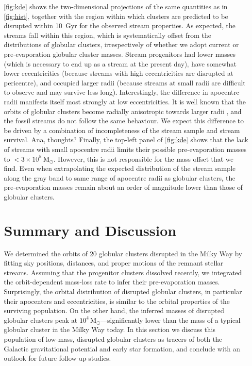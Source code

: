 \documentclass[twocolumn]{aastex63}
\newcommand{\msun}{\ensuremath{\textrm{M}_\odot}}
\begin{document}
\autoref{fig:kde} shows the two-dimensional projections of the same quantities as in \autoref{fig:hist}, together with the region within which clusters are predicted to be disrupted within 10~Gyr for the observed stream properties. As expected, the streams fall within this region, which is systematically offset from the distributions of globular clusters, irrespectively of whether we adopt current or pre-evaporation globular cluster masses. Stream progenitors had lower masses (which is necessary to end up as a stream at the present day), have somewhat lower eccentricities (because streams with high eccentricities are disrupted at pericentre), and occupied larger radii (because streams at small radii are difficult to observe and may survive less long). Interestingly, the difference in apocentre radii manifests itself most strongly at low eccentricities. It is well known that the orbits of globular clusters become radially anisotropic towards larger radii \citep[e.g.][]{dinescu99}, and the fossil streams do not follow the same behaviour. We expect this difference to be driven by a combination of incompleteness of the stream sample and stream survival. {\color{red}Ana, thoughts?} Finally, the top-left panel of \autoref{fig:kde} shows that the lack of streams with small apocentre radii limits their possible pre-evaporation masses to $<3\times10^5~\msun$. However, this is not responsible for the mass offset that we find. Even when extrapolating the expected distribution of the stream sample along the gray band to same range of apocentre radii as globular clusters, the pre-evaporation masses remain about an order of magnitude lower than those of globular clusters.


\section{Summary and Discussion}
\label{sec:discussion}

We determined the orbits of 20 globular clusters disrupted in the Milky Way by fitting sky positions, distances, and proper motions of the remnant stellar streams.
Assuming that the progenitor clusters dissolved recently, we integrated the orbit-dependent mass-loss rate to infer their pre-evaporation masses.
Surprisingly, the orbital distribution of disrupted globular clusters, in particular their apocenters and eccentricities, is similar to the orbital properties of the surviving population.
On the other hand, the inferred masses of disrupted globular clusters peak at $10^4\,\msun$---significantly lower than the mass of a typical globular cluster in the Milky Way today.
In this section we discuss this population of low-mass, disrupted globular clusters as tracers of both the Galactic gravitational potential and early star formation, and conclude with an outlook for future follow-up studies.
\end{document}
